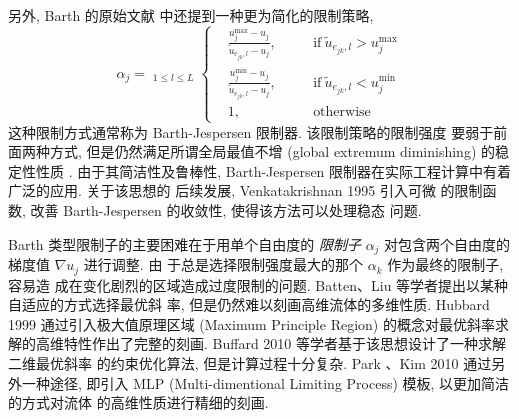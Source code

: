 另外, Barth 的原始文献 \cite{Barth1989} 中还提到一种更为简化的限制策略,
\begin{equation}
  \label{eq:simplified-barth-limiter}
  \alpha_{j} = \mathop{\min_{\forall e_{jk} \in \partial
      T_{j}}}_{1\le l\le L}
  \left\{
    \begin{aligned}
      &\frac{u_{j}^{\max} -
        u_{j}}{\tilde{u}_{e_{jk},l} - u_{j}}, &\quad &\mbox{if}~
      \tilde{u}_{e_{jk},l} > u_{j}^{\max}\\
      &\frac{u_{j}^{\min} -
        u_{j}}{\tilde{u}_{e_{jk},l}- u_{j}}, &\quad
      &\mbox{if}~\tilde{u}_{e_{jk},l} < u_{j}^{\min}\\
      &1,  &\quad &\mbox{otherwise}
    \end{aligned}
  \right.
\end{equation}
这种限制方式通常称为 Barth-Jespersen 限制器. 该限制策略的限制强度
要弱于前面两种方式, 但是仍然满足所谓全局最值不增 (global extremum
diminishing) 的稳定性性质 \cite{Barth2004}. 由于其简洁性及鲁棒性,
Barth-Jespersen 限制器在实际工程计算中有着广泛的应用. 关于该思想的
后续发展, Venkatakrishnan 1995 \cite{Venkatakrishnan1995} 引入可微
的限制函数, 改善 Barth-Jespersen 的收敛性, 使得该方法可以处理稳态
问题.

Barth 类型限制子的主要困难在于用单个自由度的 {\it 限制子}
$\alpha_{j}$ 对包含两个自由度的梯度值 $\nabla u_{j}$ 进行调整.  由
于总是选择限制强度最大的那个 $\alpha_{k}$ 作为最终的限制子, 容易造
成在变化剧烈的区域造成过度限制的问题.  Batten、Liu
\cite{Liu1993,Batten1996} 等学者提出以某种自适应的方式选择最优斜
率, 但是仍然难以刻画高维流体的多维性质. Hubbard 1999
\cite{Hubbard1999} 通过引入极大值原理区域 (Maximum Principle
Region) 的概念对最优斜率求解的高维特性作出了完整的刻画. Buffard
2010 \cite{Buffard2010} 等学者基于该思想设计了一种求解二维最优斜率
的约束优化算法, 但是计算过程十分复杂. Park 、Kim
2010\cite{Park2010} 通过另外一种途径, 即引入 MLP
(Multi-dimentional Limiting Process) 模板, 以更加简洁的方式对流体
的高维性质进行精细的刻画.





